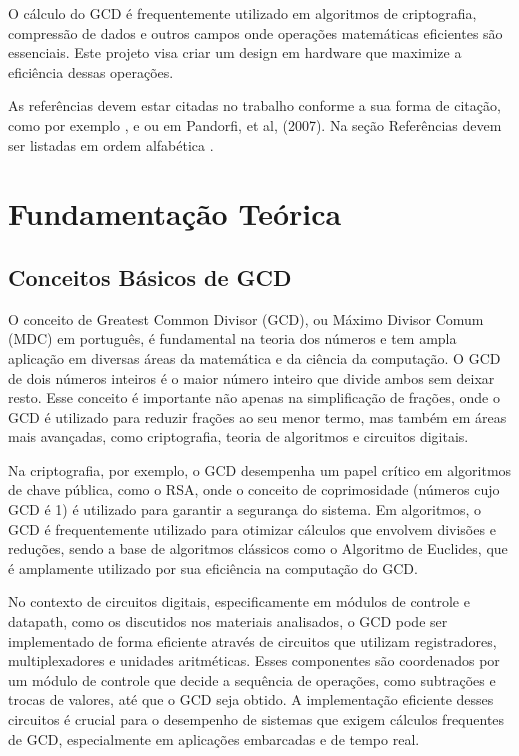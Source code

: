 \documentclass[a4paper,11pt]{article} %
\begin{document}
O cálculo do GCD é frequentemente utilizado em algoritmos de criptografia, 
compressão de dados e outros campos onde operações matemáticas eficientes 
são essenciais. 
Este projeto visa criar um design em hardware que maximize a 
eficiência dessas operações.

As referências devem estar citadas no trabalho conforme a sua forma de citação, 
como por exemplo \cite{alves}, \cite{galvani} e \cite{national_instruments} 
ou em Pandorfi, et al, (2007). 
Na seção Referências devem ser listadas em ordem alfabética \cite{pandorfi}.

\section{Fundamentação Teórica}

\subsection{Conceitos Básicos de GCD}
O conceito de Greatest Common Divisor (GCD), ou Máximo Divisor Comum (MDC) em português, é fundamental na teoria dos números e tem ampla aplicação em diversas áreas da matemática e da ciência da computação. O GCD de dois números inteiros é o maior número inteiro que divide ambos sem deixar resto. Esse conceito é importante não apenas na simplificação de frações, onde o GCD é utilizado para reduzir frações ao seu menor termo, mas também em áreas mais avançadas, como criptografia, teoria de algoritmos e circuitos digitais.

Na criptografia, por exemplo, o GCD desempenha um papel crítico em algoritmos de chave pública, como o RSA, onde o conceito de coprimosidade (números cujo GCD é 1) é utilizado para garantir a segurança do sistema. Em algoritmos, o GCD é frequentemente utilizado para otimizar cálculos que envolvem divisões e reduções, sendo a base de algoritmos clássicos como o Algoritmo de Euclides, que é amplamente utilizado por sua eficiência na computação do GCD.

No contexto de circuitos digitais, especificamente em módulos de controle e datapath, como os discutidos nos materiais analisados, o GCD pode ser implementado de forma eficiente através de circuitos que utilizam registradores, multiplexadores e unidades aritméticas. Esses componentes são coordenados por um módulo de controle que decide a sequência de operações, como subtrações e trocas de valores, até que o GCD seja obtido. A implementação eficiente desses circuitos é crucial para o desempenho de sistemas que exigem cálculos frequentes de GCD, especialmente em aplicações embarcadas e de tempo real.
\end{document}
